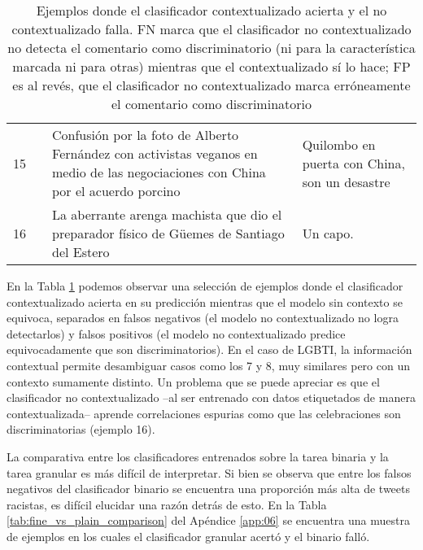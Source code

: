\begin{table}[ht!]
\begin{tabular}{p{} p{} p{} p{}}
                   \hline
        15 &            & Confusión por la foto de Alberto Fernández con activistas veganos en medio de las negociaciones con China por el acuerdo porcino & Quilombo en puerta con China, son un desastre \\
        16 &            & La aberrante arenga machista que dio el preparador físico de Güemes de Santiago del Estero & Un capo. \\
        \hline
    \end{tabular}
    \caption{Ejemplos donde el clasificador contextualizado acierta y el no contextualizado falla. FN marca que el clasificador no contextualizado no detecta el comentario como discriminatorio (ni para la característica marcada ni para otras) mientras que el contextualizado sí lo hace; FP es al revés, que el clasificador no contextualizado marca erróneamente el comentario como discriminatorio  }
    \label{tab:context_vs_no_context_error}
\end{table}


En la Tabla \ref{tab:context_vs_no_context_error} podemos observar una selección de ejemplos donde el clasificador contextualizado acierta en su predicción mientras que el modelo sin contexto se equivoca, separados en falsos negativos (el modelo no contextualizado no logra detectarlos) y falsos positivos (el modelo no contextualizado predice equivocadamente que son discriminatorios). En el caso de LGBTI, la información contextual permite desambiguar casos como los 7 y 8, muy similares pero con un contexto sumamente distinto. Un problema que se puede apreciar es que el clasificador no contextualizado --al ser entrenado con datos etiquetados de manera contextualizada-- aprende correlaciones espurias como que las celebraciones son discriminatorias (ejemplo 16).

La comparativa entre los clasificadores entrenados sobre la tarea binaria y la tarea granular es más difícil de interpretar. Si bien se observa que entre los falsos negativos del clasificador binario se encuentra una proporción más alta de tweets racistas, es difícil elucidar una razón detrás de esto. En la Tabla \ref{tab:fine_vs_plain_comparison} del Apéndice \ref{app:06} se encuentra una muestra de ejemplos en los cuales el clasificador granular acertó y el binario falló.
